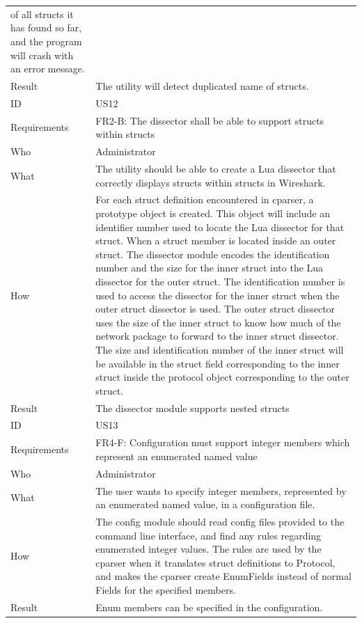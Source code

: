\begin{table}[htbp]
{\begin{tabularx}{1.2\textwidth}{l X}
		of all structs it has found so far, and the program will 	crash with an error message. \\
	Result & The utility will detect duplicated name of structs. \\
	\midrule
	ID & US12 \\
	Requirements & FR2-B: The dissector shall be able to support structs within structs \\
	Who & Administrator \\
	What & The utility should be able to create a Lua dissector that correctly
	displays structs within structs in Wireshark. \\
	How & For each struct definition encountered in cparser, a prototype object is created. This object will include an 	identifier number used to locate
		the Lua dissector for that struct. When a struct member is located inside an outer struct. The dissector module encodes the identification number 
		and the size for the inner struct into the Lua dissector for the outer struct. The identification number is used to access the dissector for the inner
		struct when the outer struct dissector is used. The outer struct dissector uses the size of the inner struct to know how much of the network package
		to forward to the inner struct dissector. The size and identification number of the inner struct will be available in the struct field corresponding to
		the inner struct inside the protocol object corresponding to the outer struct.  \\
	Result & The dissector module supports nested structs \\
	\midrule
	ID & US13 \\
	Requirements & FR4-F: Configuration must support integer members which represent an enumerated named value \\
	Who & Administrator \\
	What & The user wants to specify integer members, represented by an enumerated named value, in a configuration file. \\
	How & The config module should read config files provided to the command line interface, and find any rules regarding enumerated integer values.
		The rules are used by the cparser when it translates 	struct definitions to Protocol, and makes the cparser create EnumFields instead of normal
		Fields for the specified members. \\
	Result & Enum members can be specified in the configuration. \\
	\bottomrule
\end{tabularx}}
\end{table}

